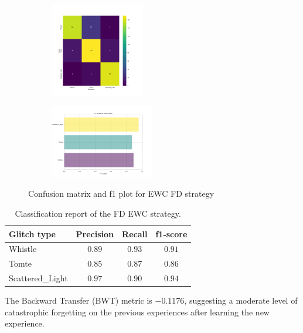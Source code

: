 \begin{figure}[H]
\centering
\begin{subfigure}
  \centering
  \includegraphics[width=0.45\textwidth]{Images/cm_FD_model_EWC.png}  
  \label{fig:fd_sub-first}
\end{subfigure}
\begin{subfigure}
  \centering
  \includegraphics[width=0.50\textwidth]{Images/f1_FD_model_EWC.png}  
  \label{fig:fd_sub-second}
\end{subfigure}
\caption{Confusion matrix and f1 plot for EWC FD strategy}
\label{fig:cm_f1_FD_EWC}
\end{figure}

\begin{table}[ht]
\centering
    \begin{tabular}{|l|c c c|}
    \hline
    \textbf{Glitch type} & \textbf{Precision} & \textbf{Recall} & \textbf{f1-score} \\ \hline
    Whistle & $0.89$ & $0.93$ & $0.91$ \\
    Tomte & $0.85$ & $0.87$ & $0.86$ \\
    Scattered\_Light & $0.97$ & $0.90$ & $0.94$ \\
    \hline
    \end{tabular}
    \caption{Classification report of the FD EWC strategy.}
    \label{tbl:RQ2_class_report_FD_EWC}
\end{table}


The Backward Transfer (BWT) metric is $-0.1176$, suggesting a moderate level of catastrophic forgetting on the previous experiences after learning the new experience.\\

